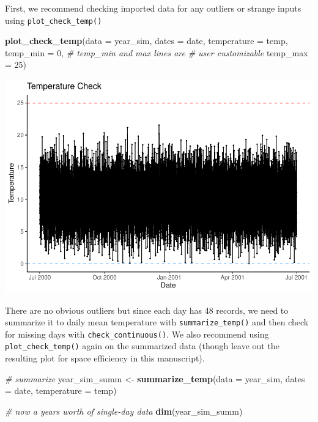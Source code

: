 \documentclass[webpdf,large,contemporary,namedate]{oup-authoring-template}
\newenvironment{Shaded}{\begin{snugshade}}{\end{snugshade}}
\newcommand{\AttributeTok}[1]{\textcolor[rgb]{0.13,0.29,0.53}{#1}}
\newcommand{\CommentTok}[1]{\textcolor[rgb]{0.56,0.35,0.01}{\textit{#1}}}
\newcommand{\DecValTok}[1]{\textcolor[rgb]{0.00,0.00,0.81}{#1}}
\newcommand{\FunctionTok}[1]{\textcolor[rgb]{0.13,0.29,0.53}{\textbf{#1}}}
\newcommand{\NormalTok}[1]{#1}
\newcommand{\OtherTok}[1]{\textcolor[rgb]{0.56,0.35,0.01}{#1}}
\theoremstyle{thmstyleone}
\theoremstyle{thmstyletwo}
\theoremstyle{thmstylethree}
\begin{document}
First, we recommend checking imported data for any outliers or strange
inputs using \texttt{plot\_check\_temp()}

\begin{Shaded}
\begin{Highlighting}[]
\FunctionTok{plot\_check\_temp}\NormalTok{(}\AttributeTok{data =}\NormalTok{ year\_sim,}
                \AttributeTok{dates =}\NormalTok{ date,}
                \AttributeTok{temperature =}\NormalTok{ temp,}
                \AttributeTok{temp\_min =} \DecValTok{0}\NormalTok{, }\CommentTok{\# temp\_min and max lines are }
                              \CommentTok{\# user customizable}
                \AttributeTok{temp\_max =} \DecValTok{25}\NormalTok{)}
\end{Highlighting}
\end{Shaded}

\includegraphics[width=1\linewidth]{paper_oxford_files/figure-latex/unnamed-chunk-5-1}

There are no obvious outliers but since each day has 48 records, we need
to summarize it to daily mean temperature with
\texttt{summarize\_temp()} and then check for missing days with
\texttt{check\_continuous()}. We also recommend using
\texttt{plot\_check\_temp()} again on the summarized data (though leave
out the resulting plot for space efficiency in this manuscript).

\begin{Shaded}
\begin{Highlighting}[]
\CommentTok{\# summarize}
\NormalTok{year\_sim\_summ }\OtherTok{\textless{}{-}} \FunctionTok{summarize\_temp}\NormalTok{(}\AttributeTok{data =}\NormalTok{ year\_sim,}
                                \AttributeTok{dates =}\NormalTok{ date,}
                                \AttributeTok{temperature =}\NormalTok{ temp)}

\CommentTok{\# now a year\textquotesingle{}s worth of single{-}day data}
\FunctionTok{dim}\NormalTok{(year\_sim\_summ)}
\end{Highlighting}
\end{Shaded}
\end{document}

